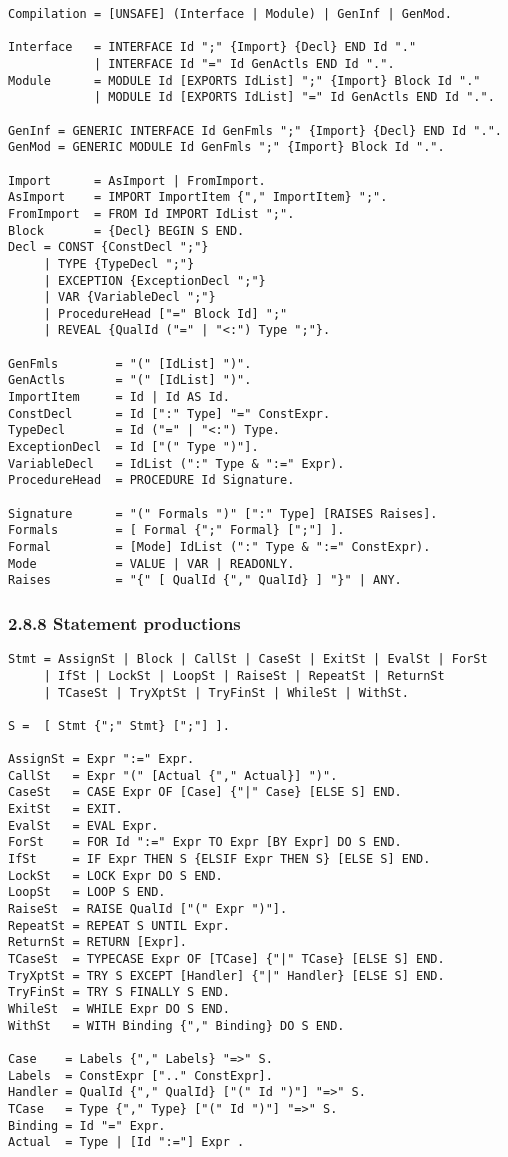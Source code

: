 \documentclass[10pt]{article}
\begin{document}
\begin{verbatim}
Compilation = [UNSAFE] (Interface | Module) | GenInf | GenMod.

Interface   = INTERFACE Id ";" {Import} {Decl} END Id "."
            | INTERFACE Id "=" Id GenActls END Id ".".
Module      = MODULE Id [EXPORTS IdList] ";" {Import} Block Id "."
            | MODULE Id [EXPORTS IdList] "=" Id GenActls END Id ".".

GenInf = GENERIC INTERFACE Id GenFmls ";" {Import} {Decl} END Id ".".
GenMod = GENERIC MODULE Id GenFmls ";" {Import} Block Id ".".

Import      = AsImport | FromImport.
AsImport    = IMPORT ImportItem {"," ImportItem} ";".
FromImport  = FROM Id IMPORT IdList ";".
Block       = {Decl} BEGIN S END.
Decl = CONST {ConstDecl ";"}
     | TYPE {TypeDecl ";"}
     | EXCEPTION {ExceptionDecl ";"}
     | VAR {VariableDecl ";"}
     | ProcedureHead ["=" Block Id] ";"
     | REVEAL {QualId ("=" | "<:") Type ";"}.

GenFmls        = "(" [IdList] ")".
GenActls       = "(" [IdList] ")".
ImportItem     = Id | Id AS Id.
ConstDecl      = Id [":" Type] "=" ConstExpr.
TypeDecl       = Id ("=" | "<:") Type.
ExceptionDecl  = Id ["(" Type ")"].
VariableDecl   = IdList (":" Type & ":=" Expr).
ProcedureHead  = PROCEDURE Id Signature.

Signature      = "(" Formals ")" [":" Type] [RAISES Raises].
Formals        = [ Formal {";" Formal} [";"] ].
Formal         = [Mode] IdList (":" Type & ":=" ConstExpr).
Mode           = VALUE | VAR | READONLY.
Raises         = "{" [ QualId {"," QualId} ] "}" | ANY.
\end{verbatim}

\subsubsection*{2.8.8 Statement productions}

\begin{verbatim}
Stmt = AssignSt | Block | CallSt | CaseSt | ExitSt | EvalSt | ForSt
     | IfSt | LockSt | LoopSt | RaiseSt | RepeatSt | ReturnSt
     | TCaseSt | TryXptSt | TryFinSt | WhileSt | WithSt.

S =  [ Stmt {";" Stmt} [";"] ].

AssignSt = Expr ":=" Expr.
CallSt   = Expr "(" [Actual {"," Actual}] ")".
CaseSt   = CASE Expr OF [Case] {"|" Case} [ELSE S] END.
ExitSt   = EXIT.
EvalSt   = EVAL Expr.
ForSt    = FOR Id ":=" Expr TO Expr [BY Expr] DO S END.
IfSt     = IF Expr THEN S {ELSIF Expr THEN S} [ELSE S] END.
LockSt   = LOCK Expr DO S END.
LoopSt   = LOOP S END.
RaiseSt  = RAISE QualId ["(" Expr ")"].
RepeatSt = REPEAT S UNTIL Expr.
ReturnSt = RETURN [Expr].
TCaseSt  = TYPECASE Expr OF [TCase] {"|" TCase} [ELSE S] END.
TryXptSt = TRY S EXCEPT [Handler] {"|" Handler} [ELSE S] END.
TryFinSt = TRY S FINALLY S END.
WhileSt  = WHILE Expr DO S END.
WithSt   = WITH Binding {"," Binding} DO S END.

Case    = Labels {"," Labels} "=>" S.
Labels  = ConstExpr [".." ConstExpr].
Handler = QualId {"," QualId} ["(" Id ")"] "=>" S.
TCase   = Type {"," Type} ["(" Id ")"] "=>" S.
Binding = Id "=" Expr.
Actual  = Type | [Id ":="] Expr .
\end{verbatim}
\end{document}
